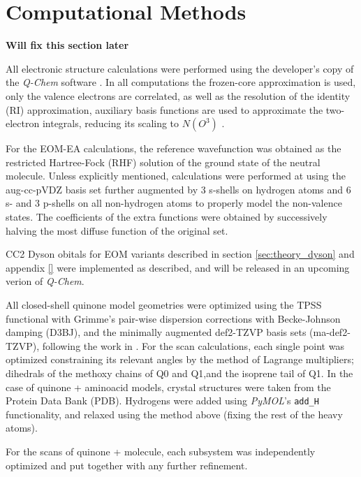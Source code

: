 \chapter{Computational Methods}\label{ch:methods}

\textbf{Will fix this section later}

All electronic structure calculations were performed using the developer's copy of the \textit{Q-Chem} software \cite{QChem5}. In all computations the frozen-core
approximation is used, only the valence electrons are correlated, as well as the resolution of the identity (RI) approximation, auxiliary basis functions are used to approximate the two-electron integrals, reducing its scaling to $N(O^3)$ \cite{hattig2000cc2}.

For the EOM-EA calculations, the reference wavefunction was obtained as the restricted Hartree-Fock (RHF) solution of the ground state of the neutral molecule. Unless explicitly mentioned, calculations were performed at using the aug-cc-pVDZ basis set \cite{dunning1989gaussian} further augmented by 3 s-shells on hydrogen atoms and 6 s- and 3 p-shells on all non-hydrogen atoms \cite{paran2024performance} to properly model the non-valence states. The coefficients of the extra functions were obtained by successively halving the most diffuse function of the original set.

CC2 Dyson obitals for EOM variants described in section \ref{sec:theory_dyson} and appendix \ref{} were implemented as described, and will be released in an upcoming verion of \textit{Q-Chem}.

All closed-shell quinone model geometries were optimized using the TPSS functional\cite{tao2003climbing} with Grimme's pair-wise dispersion corrections with Becke-Johnson damping (D3BJ)\cite{grimme2011effect}, and the minimally augmented\cite{zheng2011minimally} def2-TZVP basis sets\cite{weigend2005balanced} (ma-def2-TZVP), following the work in \cite{schulz2018systematic}. For the scan calculations, each single point was optimized constraining its relevant angles by the method of Lagrange multipliers; dihedrals of the methoxy chains of Q0 and Q1,and the isoprene tail of Q1.
In the case of quinone + aminoacid models, crystal structures were taken from the Protein Data Bank (PDB). Hydrogens were added using \textit{PyMOL}'s \cite{PyMOL} \texttt{add\_H}  functionality, and relaxed using the method above (fixing the rest of the heavy atoms).

For the scans of quinone + molecule, each subsystem was independently optimized and put together with any further refinement.

